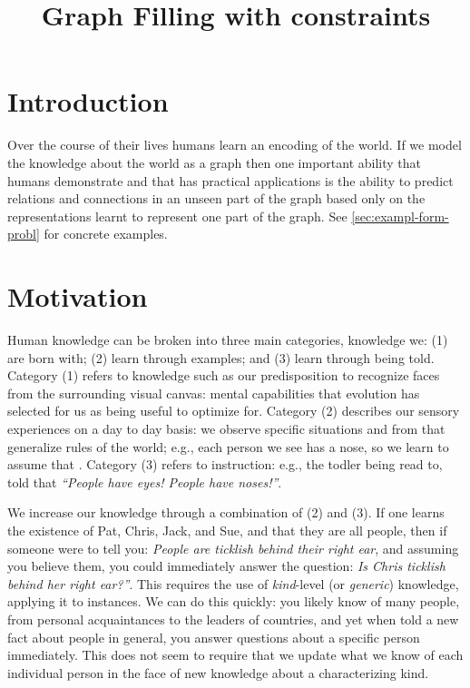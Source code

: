\documentclass[11pt]{article}
\title{Graph Filling with constraints}
\newcommand{\eg}{e.g.,\xspace}
\begin{document}
\maketitle
\section{Introduction}
\label{sec:introduction}
Over the course of their lives humans learn an encoding of the world.
If we model the knowledge about the world as a graph then one
important ability that humans demonstrate and that has practical
applications is the ability to predict relations and connections in an
unseen part of the graph based only on the representations learnt to
represent one part of the graph. See \ref{sec:exampl-form-probl} for
concrete examples.

\section{Motivation}
Human knowledge can be broken into three main categories, knowledge
we: (1) are born with; (2) learn through examples; and (3) learn
through being told.  Category (1) refers to knowledge such as our
predisposition to recognize faces from the surrounding visual canvas:
mental capabilities that evolution has selected for us as being useful
to optimize for.  Category (2) describes our sensory experiences on a
day to day basis: we observe specific situations and from that
generalize rules of the world; \eg each person we see has a nose, so
we learn to assume that . Category (3) refers
to instruction: \eg the todler being read to, told that \emph{``People
  have eyes! People have noses!''}.

We increase our knowledge through a combination of (2) and (3).  If
one learns the existence of Pat, Chris, Jack, and Sue, and that they
are all people, then if someone were to tell you: \emph{People are
  ticklish behind their right ear}, and assuming you believe them,
you could immediately answer the question: \emph{Is Chris ticklish
  behind her right ear?''}.  This requires the use of
\emph{kind}-level (or \emph{generic}) knowledge, applying it to
instances.  We can do this quickly: you likely know of many people,
from personal acquaintances to the leaders of countries, and yet when
told a new fact about people in general, you answer questions about a
specific person immediately.  This does not seem to require that we
update what we know of each individual person in the face of new
knowledge about a characterizing kind.
\end{document}
